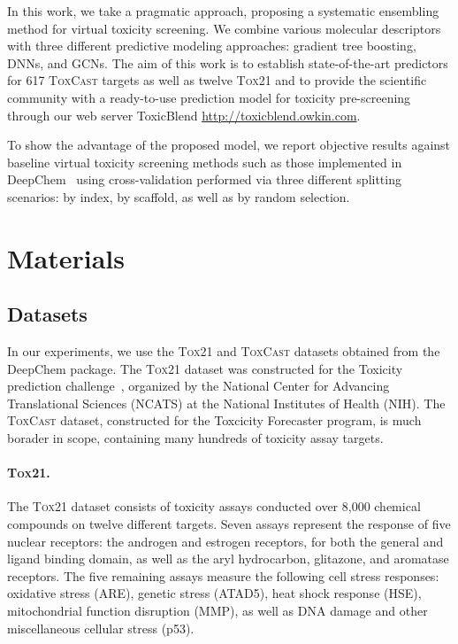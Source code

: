 \documentclass[11pt,a4paper]{article}
\begin{document}
In this work, we take a pragmatic approach, proposing a systematic ensembling 
method for virtual toxicity screening.
We combine various molecular descriptors with three different 
predictive modeling approaches: gradient tree boosting, DNNs, and GCNs. 
The aim of this work is to establish state-of-the-art
predictors for 617 \textsc{ToxCast} targets as well as twelve \textsc{Tox21} and
to provide the scientific community with a ready-to-use prediction model for toxicity
pre-screening through our web server ToxicBlend \url{http://toxicblend.owkin.com}.

To show the advantage of the proposed model, we report objective results against baseline
virtual toxicity screening methods such as those implemented in DeepChem~\cite{Wu:2017}
using cross-validation performed via three different splitting scenarios: by index,
by scaffold, as well as by random selection.

\section{Materials}
\subsection{Datasets}
\label{sec:datasets}
In our experiments, we use the \textsc{Tox21} and \textsc{ToxCast} datasets obtained 
from the DeepChem package\cite{Wu:2017}. The \textsc{Tox21} dataset was constructed for the
Toxicity prediction challenge~\cite{Huang:2017aa}, organized by the National Center 
for Advancing Translational Sciences (NCATS) at the National Institutes of Health (NIH). 
The \textsc{ToxCast} dataset, constructed for the Toxcicity Forecaster program, 
is much borader in scope, containing many hundreds of toxicity assay targets. 


\paragraph{\textsc{Tox21.}}The \textsc{Tox21} dataset consists of toxicity assays conducted over 8,000 chemical compounds 
on twelve different targets. 
Seven assays represent the response of five nuclear receptors: 
the androgen and estrogen receptors, for both the general and ligand binding domain, as well as 
the aryl hydrocarbon, glitazone, and aromatase receptors. The five remaining assays measure the
following cell stress responses: oxidative stress (ARE), genetic stress (ATAD5), heat shock
response (HSE), mitochondrial function disruption (MMP), as well as DNA damage and 
other miscellaneous cellular stress (p53).
\end{document}
